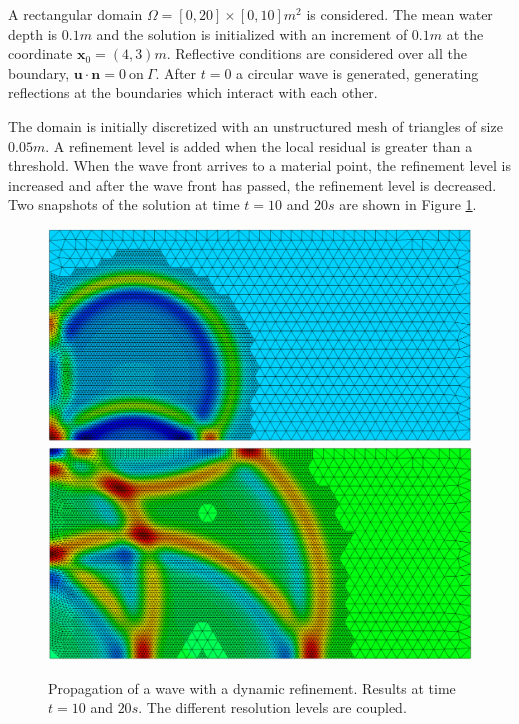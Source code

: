 A rectangular domain $\Omega=[0,20]\times[0,10]m^2$ is considered. The mean water depth is $0.1m$ and the solution is initialized with an increment of $0.1m$ at the coordinate $\mathbf{x}_0=(4,3)m$. Reflective conditions are considered over all the boundary, $\mathbf{u} \cdot \mathbf{n} = 0\ \text{on}\ \Gamma$.
After $t=0$ a circular wave is generated, generating reflections at the boundaries which interact with each other.

The domain is initially discretized with an unstructured mesh of triangles of size $0.05m$. A refinement level is added when the local residual is greater than a threshold. When the wave front arrives to a material point, the refinement level is increased and after the wave front has passed, the refinement level is decreased.
Two snapshots of the solution at time $t=10$ and $20s$ are shown in Figure \ref{multilevel_dynamic}.


\begin{figure} [htb]
    \centering
    \includegraphics[width=\textwidth]{img/multigrid/dynamic/dynamic-10-min}\\
    \vspace{5pt}
    \includegraphics[width=\textwidth]{img/multigrid/dynamic/dynamic-20-min}
    \caption{Propagation of a wave with a dynamic refinement. Results at time $t=10$ and $20s$. The different resolution levels are coupled.}
    \label{multilevel_dynamic}
\end{figure}


